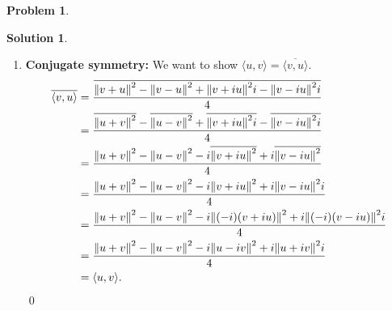 \documentclass{article}
\theoremstyle{definition}
\newtheorem*{prob*}{Problem}
\newtheorem*{sln*}{Solution}
\newcommand{\la}{\langle}
\newcommand{\ra}{\rangle}
\begin{document}
\begin{prob*}
\begin{enumerate}
\begin{sln*}
\begin{enumerate}
				\item \textbf{Conjugate symmetry:} We want to show $\la u,v \ra = \overline{\la v,u \ra}$. 
				\begin{align*}
				\overline{\la v,u \ra} 
				&= \frac{\overline{\norm{v+u}^2  - \norm{v-u}^2 + \norm{v + iu}^2i - \norm{v - iu}^2i  } }{4}\\
				&= \frac{\overline{\norm{u+ v}^2}  - \overline{\norm{u-v}^2} + \overline{\norm{v + iu}^2i} - \overline{\norm{v - iu}^2i  } }{4} \\
				&= \frac{{\norm{u+ v}^2}  - {\norm{u-v}^2} - i\overline{\norm{v + iu}^2} + i\overline{\norm{v - iu}^2  } }{4}\\
				&= \frac{{\norm{u+ v}^2}  - {\norm{u-v}^2} - i{\norm{v + iu}^2} + i{\norm{v - iu}^2i  } }{4}\\
				&= \frac{{\norm{u+ v}^2}  - {\norm{u-v}^2} - i{\norm{(-i)(v + iu)}^2} + i{\norm{(-i)(v - iu)}^2i  } }{4}\\
				&= \frac{{\norm{u+ v}^2}  - {\norm{u-v}^2} - i{\norm{u -iv}^2} + i{\norm{u + iv}^2i  } }{4}\\
				&= \la u,v \ra.
				\end{align*}\qed
				
				
				\end{enumerate}
		\end{sln*}
		
	\end{enumerate}
	

\end{prob*}


\newpage
\end{document}
